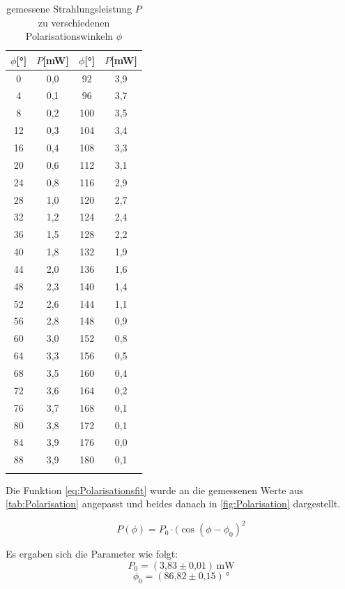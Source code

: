 \begin{table}
\centering
\caption{gemessene Strahlungsleistung $P$ zu verschiedenen Polarisationswinkeln $\phi$}
\begin{tabular}{c c c c}
\toprule
{$\phi$[°]} & {$P$[mW]} & {$\phi$[°]} & {$P$[mW]}\\
\midrule
0	&	0,0	&	92	&	3,9	\\
4	&	0,1	&	96	&	3,7	\\
8	&	0,2	&	100	&	3,5	\\
12	&	0,3	&	104	&	3,4	\\
16	&	0,4	&	108	&	3,3	\\
20	&	0,6	&	112	&	3,1	\\
24	&	0,8	&	116	&	2,9	\\
28	&	1,0	&	120	&	2,7	\\
32	&	1,2	&	124	&	2,4	\\
36	&	1,5	&	128	&	2,2	\\
40	&	1,8	&	132	&	1,9	\\
44	&	2,0	&	136	&	1,6	\\
48	&	2,3	&	140	&	1,4	\\
52	&	2,6	&	144	&	1,1	\\
56	&	2,8	&	148	&	0,9	\\
60	&	3,0	&	152	&	0,8	\\
64	&	3,3	&	156	&	0,5	\\
68	&	3,5	&	160	&	0,4	\\
72	&	3,6	&	164	&	0,2	\\
76	&	3,7	&	168	&	0,1	\\
80	&	3,8	&	172	&	0,1	\\
84	&	3,9	&	176	&	0,0	\\
88	&	3,9	&	180	&	0,1	\\
\bottomrule
\label{tab:Polarisation}
\end{tabular}
\end{table}


Die Funktion \autoref{eq:Polarisationsfit} wurde an die gemessenen Werte aus \autoref{tab:Polarisation} angepasst und beides danach in \autoref{fig:Polarisation} dargestellt.


\begin{equation}
P(\phi) = P_0\cdot(\cos(\phi - \phi_0)^{2}
\label{eq:Polarisationsfit}
\end{equation}

Es ergaben sich die Parameter wie folgt:
\begin{equation}
P_0 = (\text{3,83} \pm \text{0,01})\,\text{mW}
\end{equation}
\begin{equation}
\phi_0 = (\text{86,82} \pm \text{0,15})\,\text{°}
\end{equation}


